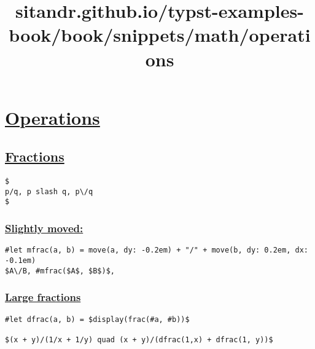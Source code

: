 \title{sitandr.github.io/typst-examples-book/book/snippets/math/operations}

\section{\texorpdfstring{\hyperref[operations]{Operations}}{Operations}}\label{operations}

\subsection{\texorpdfstring{\hyperref[fractions]{Fractions}}{Fractions}}\label{fractions}

\begin{verbatim}
$
p/q, p slash q, p\/q
$
\end{verbatim}

\pandocbounded{}

\subsubsection{\texorpdfstring{\hyperref[slightly-moved]{Slightly
moved:}}{Slightly moved:}}\label{slightly-moved}

\begin{verbatim}
#let mfrac(a, b) = move(a, dy: -0.2em) + "/" + move(b, dy: 0.2em, dx: -0.1em)
$A\/B, #mfrac($A$, $B$)$,
\end{verbatim}

\pandocbounded{}

\subsubsection{\texorpdfstring{\hyperref[large-fractions]{Large
fractions}}{Large fractions}}\label{large-fractions}

\begin{verbatim}
#let dfrac(a, b) = $display(frac(#a, #b))$

$(x + y)/(1/x + 1/y) quad (x + y)/(dfrac(1,x) + dfrac(1, y))$
\end{verbatim}

\pandocbounded{}
